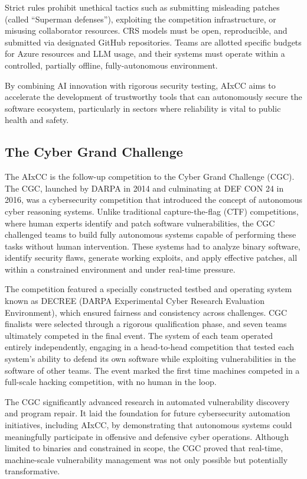 Strict rules prohibit unethical tactics such as submitting misleading patches (called ``Superman defenses''), exploiting the competition infrastructure, or misusing collaborator resources.
CRS models must be open, reproducible, and submitted via designated GitHub repositories.
Teams are allotted specific budgets for Azure resources and LLM usage, and their systems must operate within a controlled, partially offline, fully-autonomous environment.

By combining AI innovation with rigorous security testing, AIxCC aims to accelerate the development of trustworthy tools that can autonomously secure the software ecosystem, particularly in sectors where reliability is vital to public health and safety.

\subsection{The Cyber Grand Challenge}
\label{sec:bg-cgc}

The AIxCC is the follow-up competition to the Cyber Grand Challenge (CGC).
The CGC, launched by DARPA in 2014 and culminating at DEF CON 24 in 2016, was a cybersecurity competition that introduced the concept of autonomous cyber reasoning systems.
Unlike traditional capture-the-flag (CTF) competitions, where human experts identify and patch software vulnerabilities, the CGC challenged teams to build fully autonomous systems capable of performing these tasks without human intervention.
These systems had to analyze binary software, identify security flaws, generate working exploits, and apply effective patches, all within a constrained environment and under real-time pressure.

The competition featured a specially constructed testbed and operating system known as DECREE (DARPA Experimental Cyber Research Evaluation Environment), which ensured fairness and consistency across challenges.
CGC finalists were selected through a rigorous qualification phase, and seven teams ultimately competed in the final event.
The system of each team operated entirely independently, engaging in a head-to-head competition that tested each system's ability to defend its own software while exploiting vulnerabilities in the software of other teams.
The event marked the first time machines competed in a full-scale hacking competition, with no human in the loop.

The CGC significantly advanced research in automated vulnerability discovery and program repair.
It laid the foundation for future cybersecurity automation initiatives, including AIxCC, by demonstrating that autonomous systems could meaningfully participate in offensive and defensive cyber operations.
Although limited to binaries and constrained in scope, the CGC proved that real-time, machine-scale vulnerability management was not only possible but potentially transformative.

